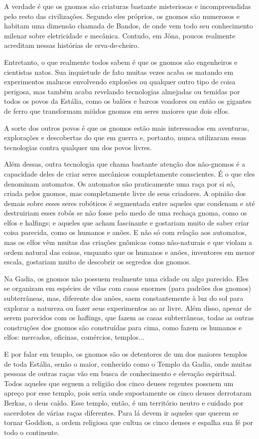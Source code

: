 \begin{multicols}{2}
A verdade é que os gnomos são criaturas bastante misteriosas e incompreendidas
pelo resto das civilizações. Segundo eles próprios, os gnomos são numerosos e
habitam uma dimensão chamada de Bandos, de onde vem todo seu conhecimento
milenar sobre eletricidade e mecânica. Contudo, em Jǒna, poucos realmente
acreditam nessas histórias de erva-de-cheiro.

Entretanto, o que realmente todos sabem é que os gnomos são engenheiros e
cientistas natos. Sua inquietude de fato muitas vezes acaba os matando em
experimentos malucos envolvendo explosões ou qualquer outro tipo de coisa
perigosa, mas também acaba revelando tecnologias almejadas ou temidas por todos
os povos da Estália, como os balões e barcos voadores ou então os gigantes de
ferro que transformam miúdos gnomos em seres maiores que dois elfos.

A sorte dos outros povos é que os gnomos estão mais interessados em aventuras,
explorações e descobertas do que em guerra e, portanto, nunca utilizaram essas
tecnologias contra qualquer um dos povos livres.

Além dessas, outra tecnologia que chama bastante atenção dos não-gnomos é a
capacidade deles de criar seres mecânicos completamente conscientes. É o que
eles denominam automatos. Os automatos são praticamente uma raça por si só,
criada pelos gnomos, mas completamente livre de seus criadores. A opinião dos
demais sobre esses seres robóticos é segmentada entre aqueles que condenam e até
destruiriam esses robôs se não fosse pelo medo de uma rechaça gnoma, como os
elfos e halfings; e aqueles que acham fascinante e gostariam muito de saber
criar coisa parecida, como os humanos e anões. E não só com relação aos
automatos, mas os elfos vêm muitas das criações gnômicas como não-naturais e que
violam a ordem natural das coisas, enquanto que os humanos e anões, inventores
em menor escala, gostariam muito de descobrir os segredos dos gnomos.

Na Gadia, os gnomos não possuem realmente uma cidade ou algo parecido. Eles se
organizam em espécies de vilas com casas enormes (para padrões dos gnomos)
subterrâneas, mas, diferente dos anões, saem constantemente à luz do sol para
explorar a natureza ou fazer seus experimentos ao ar livre. Além disso, apesar
de serem parecidos com os haflings, que fazem as casas subterrâneas, todas as
outras construções dos gnomos são construídas para cima, como fazem os humanos e
elfos: mercados, oficinas, comércios, templos...

E por falar em templo, os gnomos são os detentores de um dos maiores templos de
toda Estália, senão o maior, conhecido como o Templo da Gadia, onde muitas
pessoas de outras raças vão em busca de conhecimento e elevação espiritual.
Todos aqueles que seguem a religião dos cinco deuses regentes possuem um apreço
por esse templo, pois seria onde supostamente os cinco deuses derrotaram Berkas,
o deus caído. Esse templo, então, é um território neutro e cuidado por
sacerdotes de várias raças diferentes. Para lá devem ir aqueles que querem se
tornar Goddion, a ordem religiosa que cultua os cinco deuses e espalha sua fé
por todo o continente.


\end{multicols}
